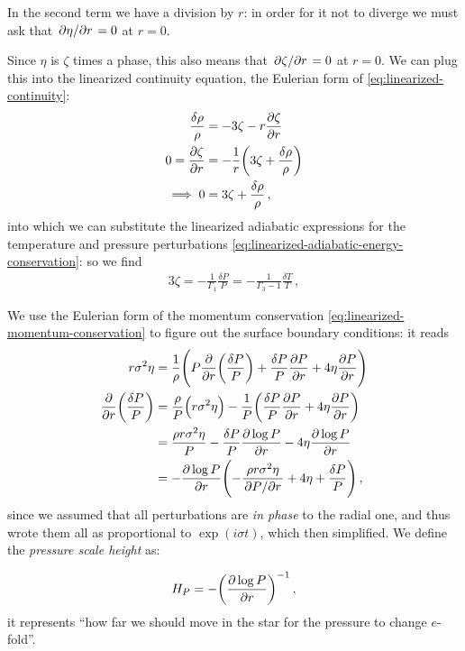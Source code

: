 \documentclass[main.tex]{subfiles}
\begin{document}
In the second term we have a division by \(r\): in order for it not to diverge we must ask that \(\pdv*{\eta }{r} =0\) at \(r=0\). 

Since \(\eta \) is \(\zeta \) times a phase, this also means that \(\pdv*{\zeta }{r} =0 \) at \(r=0\). 
We can plug this into the linearized continuity equation, the Eulerian form of \eqref{eq:linearized-continuity}: 
%
\begin{align}
\frac{ \delta \rho }{\rho } &= - 3\zeta - r\pdv{\zeta }{r} \\
0=\pdv{\zeta }{r} &= - \frac{1}{r} \qty(3\zeta + \frac{ \delta \rho }{\rho })  \\
\implies 0 &= 3\zeta + \frac{ \delta \rho }{\rho }
\,,
\end{align}
%
into which we can substitute the linearized adiabatic expressions for the temperature and pressure perturbations \eqref{eq:linearized-adiabatic-energy-conservation}: so we find 
%
\begin{align}
3\zeta = - \frac{1}{\Gamma_1 } \frac{ \delta P }{P}
= - \frac{1}{\Gamma_3 -1} \frac{ \delta T}{T}
\,,
\end{align}
%


We use the Eulerian form of the momentum conservation \eqref{eq:linearized-momentum-conservation} to figure out the surface boundary conditions: it reads 
%
\begin{align}
r \sigma^2 \eta &= 
\frac{1}{\rho } \qty(P \pdv{}{r} \qty(\frac{ \delta P}{P}) 
+ \frac{ \delta P }{P } \pdv{P}{r} 
+ 4 \eta  \pdv{P}{r})  \\
\pdv{}{r} \qty(\frac{ \delta P}{P}) &= \frac{\rho}{P} 
\qty(r \sigma^2 \eta ) - \frac{1}{P} \qty(\frac{ \delta P}{P} \pdv{P}{r} + 4 \eta  \pdv{P}{r})  \\
&= \frac{\rho r \sigma^2 \eta }{P}
- \frac{ \delta P}{P} \pdv{\log P}{r}
- 4 \eta \pdv{\log P}{r}  \\
&= -\pdv{\log P}{r} \qty(- \frac{\rho r \sigma^2 \eta }{\pdv*{P}{r}}
+ 4 \eta
+ \frac{ \delta P}{P} 
) 
\,,
\end{align}
%
since we assumed that all perturbations are \emph{in phase} to the radial one, and thus wrote them all as proportional to \(\exp(i \sigma t)\), which then simplified.
We define the \emph{pressure scale height} as:

\begin{equation}
  H_P = - \qty(\pdv{\log P }{r} )^{-1}\,,
\end{equation}
%
it represents ``how far we should move in the star for the pressure to change \(e\)-fold''.
\end{document}
